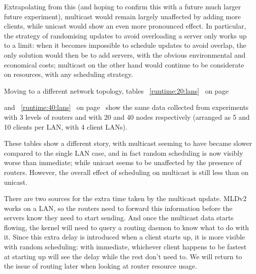 \documentclass[a4paper,11pt,twocolumn]{article}
\newcommand{\TODO}[1]{\par\noindent%
\hspace*{\fill}%
\framebox{\parbox{0.9\linewidth}{{\bf TODO: }#1}}%
\hspace*{\fill}%
}
\newcommand{\pref}[1]{%
\ref{#1}%
\ifnum\thepage=0\pageref{#1}\else\ on page~\pageref{#1}\fi%
}
\begin{document}
Extrapolating from this (and hoping to confirm this with a future much
larger future experiment), multicast would remain largely unaffected
by adding more clients, while unicast would show an even more
pronounced effect.  In particular, the strategy of randomising
updates to avoid overloading a server only works up to a limit:
when it becomes impossible to schedule updates to avoid overlap,
the only solution would then be to add servers, with the obvious
environmental and economical costs; multicast on the other hand
would continue to be considerate on resources, with any scheduling
strategy.

Moving to a different network topology, tables~\pref{runtime:20:lans}
and~\pref{runtime:40:lans} show the same data collected from experiments
with 3 levels of routers and with 20 and 40 nodes respectively
(arranged as 5 and 10 clients per LAN, with 4 client LANs).

\TODO{Show graphs}

These tables show a different story, with multicast seeming to have became
slower compared to the single LAN case, and in fact random scheduling is
now visibly worse than immediate; while unicast seems to be unaffected
by the presence of routers.  However, the overall effect of scheduling
on multicast is still less than on unicast.

There are two sources for the extra time taken by the multicast update.
MLDv2 works on a LAN, so the routers need to forward this information
before the servers know they need to start sending. And once the multicast
data starts flowing, the kernel will need to query a routing daemon
to know what to do with it. Since this extra delay is introduced
when a client starts up, it is more visible with random scheduling:
with immediate, whichever client happens to be fastest at starting up
will see the delay while the rest don't need to.  We will return to the
issue of routing later when looking at router resource usage.
\end{document}
